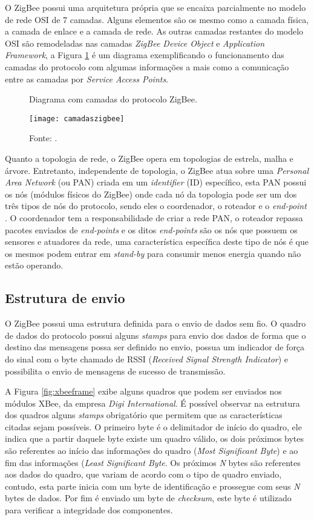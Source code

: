 O ZigBee possui uma arquitetura própria que se encaixa parcialmente no modelo de rede OSI de 7 camadas\cite{gislason2008zigbee}. Alguns elementos são os mesmo como a camada física, a camada de enlace e a camada de rede. As outras camadas restantes do modelo OSI são remodeladas nas camadas \textit{ZigBee Device Object} e \textit{Application Framework}, a Figura \ref{fig:camadaszigbee} é um diagrama exemplificando o funcionamento das camadas do protocolo com algumas informações a mais como a comunicação entre as camadas por \textit{Service Access Points}.


\begin{figure}[!htb]
	\centering
		\caption{Diagrama com camadas do protocolo ZigBee.}
		\texttt{[image: camadaszigbee]} 
		\caption*{Fonte: \cite{gislason2008zigbee}.}
		\label{fig:camadaszigbee}
\end{figure} 

Quanto a topologia de rede, o ZigBee opera em topologias de estrela, malha e árvore. Entretanto, independente de topologia, o ZigBee atua sobre uma \textit{Personal Area Network} (ou PAN) criada em um \textit{identifier} (ID) específico, esta PAN possui os nós (módulos físicos do ZigBee) onde cada nó da topologia pode ser um dos três tipos de nós do protocolo, sendo eles o coordenador, o roteador e o \textit{end-point} \cite{elahi2009zigbee}. O coordenador tem a responsabilidade de criar a rede PAN, o roteador repassa pacotes enviados de \textit{end-points} e os ditos \textit{end-points} são os nós que possuem os sensores e atuadores da rede, uma característica específica deste tipo de nós é que os mesmos podem entrar em \textit{stand-by} para consumir menos energia quando não estão operando.    

\subsection{Estrutura de envio}
O ZigBee possui uma estrutura definida para o envio de dados sem fio. O quadro de dados do protocolo possui alguns \textit{stamps} para envio dos dados de forma que o destino das mensagens possa ser definido no envio, possua um indicador de força do sinal com o byte chamado de RSSI (\textit{Received Signal Strength Indicator}) e possibilita o envio de mensagens de sucesso de transmissão. 

A Figura \ref{fig:xbeeframe} exibe alguns quadros que podem ser enviados nos módulos XBee, da empresa \textit{Digi International}. É possível observar na estrutura dos quadros alguns \textit{stamps} obrigatório que permitem que as características citadas sejam possíveis. O primeiro byte é o delimitador de início do quadro, ele indica que a partir daquele byte existe um quadro válido, os dois próximos bytes são referentes ao início das informações do quadro (\textit{Most Significant Byte}) e ao fim das informações (\textit{Least Significant Byte}. Os próximos \textit{N} bytes são referentes aos dados do quadro, que variam de acordo com o tipo de quadro enviado, contudo, esta parte inicia com um byte de identificação e prossegue com seus \textit{N} bytes de dados. Por fim é enviado um byte de \textit{checksum}, este byte é utilizado para verificar a integridade dos componentes\cite{xbeetutorial}.       

